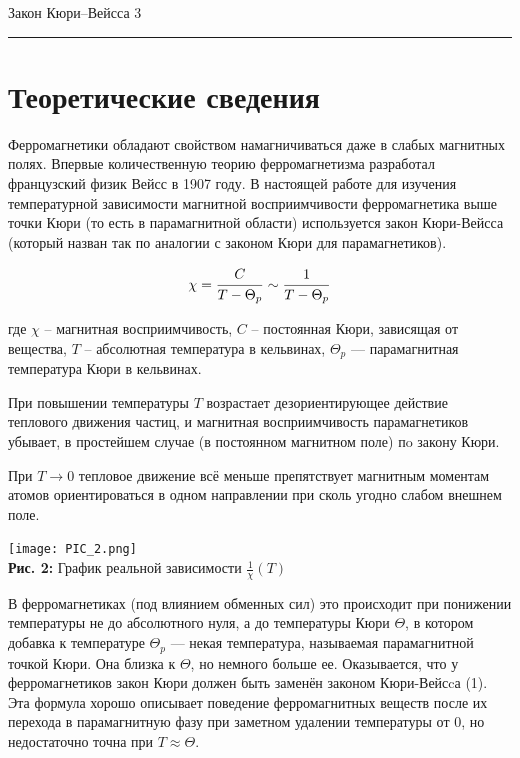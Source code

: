 \documentclass[12pt,a4paper]{scrartcl}
\begin{document}
	
	\begin{flushleft}
		\footnotesize{Закон Кюри–Вейсса} \hspace{\fill} \footnotesize{3}
		\\[-0.3cm]\noindent\rule{\textwidth}{0.3pt}
	\end{flushleft}
	
	\section{Теоретические сведения}
	
	Ферромагнетики обладают свойством намагничиваться даже в слабых магнитных полях.
	Впервые количественную теорию ферромагнетизма разработал французский физик Вейсс в
	1907 году. В настоящей работе для изучения температурной зависимости магнитной восприимчивости ферромагнетика выше точки Кюри (то есть в парамагнитной области) используется
	закон Кюри-Вейсса (который назван так по аналогии с законом Кюри для парамагнетиков).
	
	\begin{equation}
		\chi = \dfrac{\strut C}{\strut T - \Theta_p} \sim \dfrac{\strut 1}{\strut T - \Theta_p}
	\end{equation}
	
	где $\chi$ -- магнитная восприимчивость, $C$ -- постоянная Кюри, зависящая от вещества, $T$ --
	абсолютная температура в кельвинах, $\Theta_p$ — парамагнитная температура Кюри в кельвинах.
	
	При повышении температуры $T$ возрастает дезориентирующее действие теплового движения частиц, и магнитная восприимчивость парамагнетиков убывает, в простейшем случае (в постоянном магнитном поле) пo закону Кюри.
	
	При $T \rightarrow 0$ тепловое движение всё меньше препятствует магнитным моментам атомов ориентироваться
	в одном направлении при сколь угодно слабом внешнем поле. 
	
	\begin{center}
		\texttt{[image: PIC\_2.png]}
		\\\textbf{Рис. 2:} График реальной зависимости $\frac{1}{\chi}(T)$
	\end{center}
	
	В ферромагнетиках (под влиянием обменных
	сил) это происходит при понижении температуры не до	абсолютного нуля, а до температуры Кюри $\Theta$, в котором добавка к температуре $\Theta_p$ — некая температура, называемая парамагнитной точкой Кюри. Она близка к $\Theta$, но немного больше ее. Оказывается, что у ферромагнетиков закон Кюри должен быть заменён	законом Кюри-Вейсcа (1). Эта формула хорошо описывает поведение ферромагнитных веществ после их перехода в парамагнитную фазу при заметном удалении	температуры от 0, но недостаточно точна при $T \approx \Theta$.
	
\end{document}
